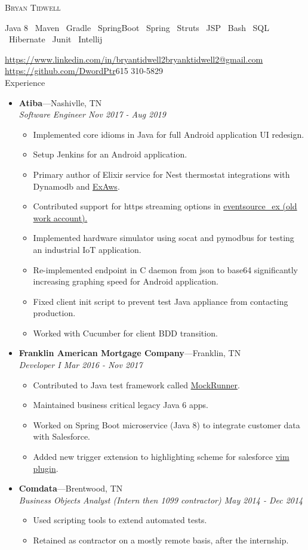 \documentclass[11pt,oneside]{article}
\makeatletter
\newcommand{\name}{Bryan Tidwell}
\newcommand{\email}{\href{mailto:bryanktidwell2@gmail.com}{bryanktidwell2@gmail.com}}
\newcommand{\phone}{615 310-5829}
\newcommand{\github}{\url{https://github.com/DwordPtr}}
\newcommand{\linkedin}{\url{https://www.linkedin.com/in/bryantidwell2}}
\newcommand{\bigname}[1]{
	\begin{center}\fontfamily{phv}\selectfont\LARGE\scshape#1\end{center}
}
\newenvironment{ressection}[1]{
	\vspace{4pt}
	{\fontfamily{phv}\selectfont\Large#1}
	\begin{itemize}
	\vspace{3pt}
}{
	\end{itemize}
}
\newcommand{\ressubitem}[1]{
	\vspace{-1pt}
	\item \begin{flushleft} #1 \end{flushleft}
}
\newcommand{\resbigitem}[3]{
	\vspace{-5pt}
	\item
	\textbf{#1}---#2 \\
	\textit{#3}
}
\newenvironment{ressubsec}[3]{
	\resbigitem{#1}{#2}{#3}
	\vspace{-2pt}
	\begin{itemize}
}{
	\end{itemize}
}
\makeatother
\begin{document}
 \selectfont

\bigname{\name}

\begin{center} Java 8 \textperiodcentered \ Maven \textperiodcentered \ Gradle \textperiodcentered 
        \ SpringBoot \textperiodcentered \ Spring \textperiodcentered \ Struts \textperiodcentered \ JSP \textperiodcentered \ Bash \textperiodcentered \ SQL  \textperiodcentered \ Hibernate \textperiodcentered \ Junit \textperiodcentered \ Intellij
\end{center}
\vspace{-1pt} {\small \linkedin \small \hfill \email} \\
\vspace{-1pt} {\small \github \small \hfill \phone} \\

\begin{ressection}{Experience}
        \begin{ressubsec}{Atiba}{Nashivlle, TN}{Software Engineer Nov 2017 - Aug 2019}
		\ressubitem{Implemented core idioms in Java for full Android application UI redesign.}
		\ressubitem{Setup Jenkins for an Android application.}
        \ressubitem{Primary author of Elixir service for Nest thermostat integrations with Dynamodb and \href{https://github.com/ex-aws/ex\_aws}{ExAws}.}
        \ressubitem{Contributed support for https streaming options in \href{https://github.com/cwc/eventsource_ex/pull/10/files}{eventsource\_ex (old work account).}}
        \ressubitem{Implemented hardware simulator using socat and pymodbus for testing an industrial IoT application.}
        \ressubitem{Re-implemented endpoint in C daemon from json to base64 significantly increasing graphing speed for Android application.}
		\ressubitem{Fixed client init script to prevent test Java appliance from contacting production.}
        \ressubitem{Worked with Cucumber for client BDD transition.}
	\end{ressubsec}

			\begin{ressubsec}{Franklin American Mortgage Company}{Franklin, TN}{Developer I Mar 2016 - Nov 2017}
                    \ressubitem{Contributed to Java test framework called \href{https://github.com/mockrunner/mockrunner/pull/42}{MockRunner}.}
		\ressubitem{Maintained business critical legacy Java 6 apps.}
        \ressubitem{Worked on Spring Boot microservice (Java 8) to integrate customer data with Salesforce.}
        \ressubitem{Added new trigger extension to highlighting scheme for salesforce \href{https://github.com/ejholmes/vim-forcedotcom/pull/13}{vim plugin}.}
	\end{ressubsec}

	\begin{ressubsec}{Comdata}{Brentwood, TN}{Business Objects Analyst (Intern then 1099 contractor) May 2014 - Dec 2014}
    \ressubitem{Used scripting tools to extend automated tests.}
    \ressubitem{Retained as contractor on a mostly remote basis, after the internship.}
	\end{ressubsec}

\end{ressection}
\end{document}
